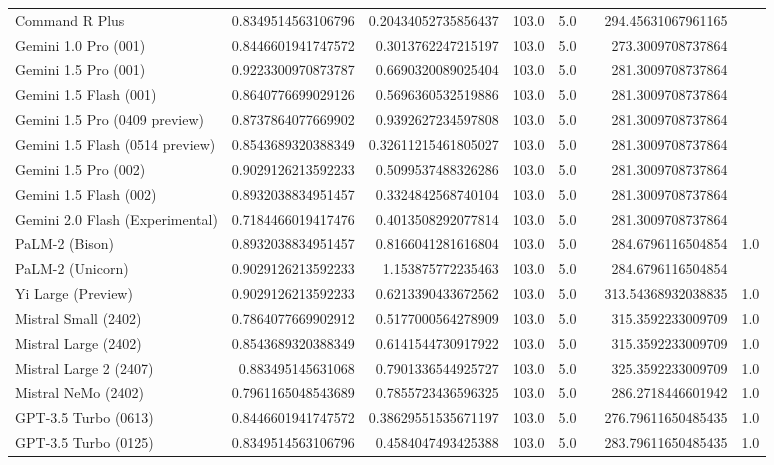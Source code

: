 \begin{table}[htp]
{\begin{tabular}{lrrrrrrr}
Command R Plus & 0.8349514563106796 & 0.20434052735856437 & 103.0 & 5.0 &  & 294.45631067961165 &  \\
Gemini 1.0 Pro (001) & 0.8446601941747572 & 0.3013762247215197 & 103.0 & 5.0 &  & 273.3009708737864 &  \\
Gemini 1.5 Pro (001) & 0.9223300970873787 & 0.6690320089025404 & 103.0 & 5.0 &  & 281.3009708737864 &  \\
Gemini 1.5 Flash (001) & 0.8640776699029126 & 0.5696360532519886 & 103.0 & 5.0 &  & 281.3009708737864 &  \\
Gemini 1.5 Pro (0409 preview) & 0.8737864077669902 & 0.9392627234597808 & 103.0 & 5.0 &  & 281.3009708737864 &  \\
Gemini 1.5 Flash (0514 preview) & 0.8543689320388349 & 0.32611215461805027 & 103.0 & 5.0 &  & 281.3009708737864 &  \\
Gemini 1.5 Pro (002) & 0.9029126213592233 & 0.5099537488326286 & 103.0 & 5.0 &  & 281.3009708737864 &  \\
Gemini 1.5 Flash (002) & 0.8932038834951457 & 0.3324842568740104 & 103.0 & 5.0 &  & 281.3009708737864 &  \\
Gemini 2.0 Flash (Experimental) & 0.7184466019417476 & 0.4013508292077814 & 103.0 & 5.0 &  & 281.3009708737864 &  \\
PaLM-2 (Bison) & 0.8932038834951457 & 0.8166041281616804 & 103.0 & 5.0 &  & 284.6796116504854 & 1.0 \\
PaLM-2 (Unicorn) & 0.9029126213592233 & 1.153875772235463 & 103.0 & 5.0 &  & 284.6796116504854 &  \\
Yi Large (Preview) & 0.9029126213592233 & 0.6213390433672562 & 103.0 & 5.0 &  & 313.54368932038835 & 1.0 \\
Mistral Small (2402) & 0.7864077669902912 & 0.5177000564278909 & 103.0 & 5.0 &  & 315.3592233009709 & 1.0 \\
Mistral Large (2402) & 0.8543689320388349 & 0.6141544730917922 & 103.0 & 5.0 &  & 315.3592233009709 & 1.0 \\
Mistral Large 2 (2407) & 0.883495145631068 & 0.7901336544925727 & 103.0 & 5.0 &  & 325.3592233009709 & 1.0 \\
Mistral NeMo (2402) & 0.7961165048543689 & 0.7855723436596325 & 103.0 & 5.0 &  & 286.2718446601942 & 1.0 \\
GPT-3.5 Turbo (0613) & 0.8446601941747572 & 0.38629551535671197 & 103.0 & 5.0 &  & 276.79611650485435 & 1.0 \\
GPT-3.5 Turbo (0125) & 0.8349514563106796 & 0.4584047493425388 & 103.0 & 5.0 &  & 283.79611650485435 & 1.0 \\

\end{tabular}}
\end{table}
